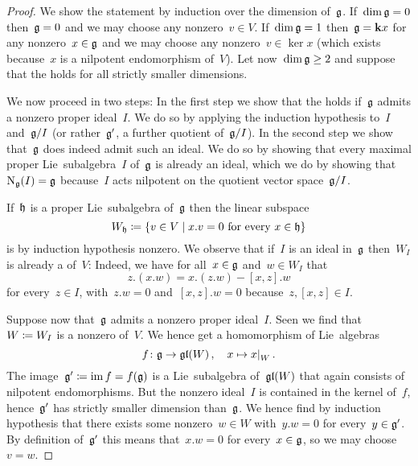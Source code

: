 \begin{proof}
  We show the statement by induction over the dimension of~$\glie$.
  If~$\dim \mathfrak{g} = 0$ then~$\mathfrak{g} = 0$ and we may choose any nonzero~$v \in V$.
  If~$\dim \mathfrak{g} = 1$ then~$\mathfrak{g} = \mathbf{k} x$ for any nonzero~$x \in \mathfrak{g}$ and we may choose any nonzero~$v \in \ker x$ (which exists because~$x$ is a nilpotent endomorphism of~$V$).
  Let now~$\dim \mathfrak{g} \geq 2$ and suppose that the  holds for all strictly smaller dimensions.
  
  We now proceed in two steps:
  In the first step we show that the  holds if~$\glie$ admits a nonzero proper ideal~$I$.
  We do so by applying the induction hypothesis to~$I$ and~$\mathfrak{g}/I$ (or rather~$\mathfrak{g}'$, a further quotient of~$\mathfrak{g}/I$).
  In the second step we show that~$\glie$ does indeed admit such an ideal.
  We do so by showing that every maximal proper Lie~subalgebra~$I$ of~$\glie$ is already an ideal, which we do by showing that~$\operatorname{N}_{\mathfrak{g}}(I) = \mathfrak{g}$ because~$I$ acts nilpotent on the quotient vector space~$\mathfrak{g}/I$.
  
  If~$\mathfrak{h}$ is a proper Lie~subalgebra of~$\glie$ then the linear subspace
  \[
    W_{\hlie}
    \defined
    \{
      v \in V
    \suchthat
      \text{$x.v = 0$ for every~$x \in \hlie$}
    \}
  \]
  is by induction hypothesis nonzero.
  We observe that if~$I$ is an ideal in~$\glie$ then~$W_I$ is already a {\subrepresentation{$\glie$}} of~$V$:
  Indeed, we have for all~$x \in \mathfrak{g}$ and~$w \in W_I$ that
  \[
    z.(x.w)
    =
    x.(z.w) - [x,z].w
  \]
  for every~$z \in I$, with~$z.w = 0$ and~$[x,z].w = 0$ because~$z, [x,z] \in I$.
  
  Suppose now that~$\glie$ admits a nonzero proper ideal~$I$.
  Seen we find that~$W \coloneqq W_I$ is a nonzero {\subrepresentation{$\glie$}} of~$V$.
  We hence get a homomorphism of Lie~algebras
  \[
    f
    \colon
    \glie
    \to
    \gllie(W) \,,
    \quad
    x
    \mapsto
    \restrict{x}{W} \,.
  \]
  The image~$\mathfrak{g}' \coloneqq \operatorname{im} f = f(\mathfrak{g})$ is a Lie~subalgebra of~$\mathfrak{gl}(W)$ that again consists of nilpotent endomorphisms.
  But the nonzero ideal~$I$ is contained in the kernel of~$f$, hence~$\mathfrak{g}'$ has strictly smaller dimension than~$\glie$.
  We hence find by induction hypothesis that there exists some nonzero~$w \in W$ with~$y.w = 0$ for every~$y \in \mathfrak{g}'$.
  By definition of~$\mathfrak{g}'$ this means that~$x.w = 0$ for every~$x \in \mathfrak{g}$, so we may choose~$v = w$.
  

\end{proof}
